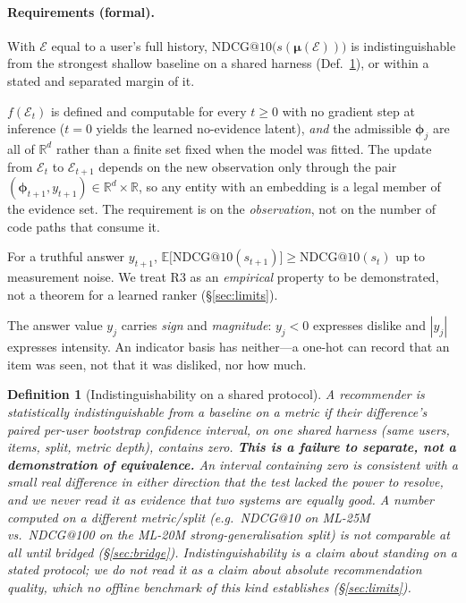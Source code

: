 \documentclass[11pt]{article}
\newtheorem{definition}{Definition}
\newcommand{\R}{\mathbb{R}}
\newcommand{\bphi}{\boldsymbol{\phi}}
\newcommand{\bmu}{\boldsymbol{\mu}}
\begin{document}
\paragraph{Requirements (formal).}
\begin{description}[leftmargin=2.4em,itemsep=1.5pt]
  \item[R1.] With $\mathcal E$ equal to a user's full history, $\mathrm{NDCG}@10\bigl(s(\bmu(\mathcal E))\bigr)$ is
        indistinguishable from the strongest shallow baseline on a shared harness (Def.~\ref{def:tie}), or within a stated
        and separated margin of it.
  \item[R2.] $f(\mathcal E_t)$ is defined and computable for every $t\ge 0$ with no gradient step at inference
        ($t{=}0$ yields the learned no-evidence latent), \emph{and} the admissible $\bphi_j$ are all of $\R^{d}$ rather than a
        finite set fixed when the model was fitted. The update from $\mathcal E_t$ to $\mathcal E_{t+1}$ depends on
        the new observation only through the pair $(\bphi_{t+1},y_{t+1})\in\R^{d}\times\R$, so any entity with an
        embedding is a legal member of the evidence set. The requirement is on the \emph{observation}, not on the
        number of code paths that consume it.
  \item[R3.] For a truthful answer $y_{t+1}$, $\mathbb E\bigl[\mathrm{NDCG}@10(s_{t+1})\bigr]\ge
        \mathrm{NDCG}@10(s_t)$ up to measurement noise. We treat R3 as an \emph{empirical} property to be
        demonstrated, not a theorem for a learned ranker (\S\ref{sec:limits}).
  \item[R4.] The answer value $y_j$ carries \emph{sign} and \emph{magnitude}: $y_j<0$ expresses dislike and $|y_j|$
        expresses intensity. An indicator basis has neither---a one-hot can record that an item was seen, not that
        it was disliked, nor how much.
\end{description}

\begin{definition}[Indistinguishability on a shared protocol]\label{def:tie}
A recommender is \emph{statistically indistinguishable} from a baseline on a metric if their difference's paired
per-user bootstrap confidence interval, on one shared harness (same users, items, split, metric depth), contains
zero. \textbf{This is a failure to separate, not a demonstration of equivalence.} An interval containing zero is
consistent with a small real difference in either direction that the test lacked the power to resolve, and we
never read it as evidence that two systems are equally good. A number computed on a different metric/split
(e.g.\ NDCG@10 on ML-25M vs.\ NDCG@100 on the ML-20M strong-generalisation split) is not comparable at all until
bridged (\S\ref{sec:bridge}). Indistinguishability is a claim about standing on a stated protocol; we do not read
it as a claim about absolute recommendation quality, which no offline benchmark of this kind establishes
(\S\ref{sec:limits}).
\end{definition}
\end{document}
